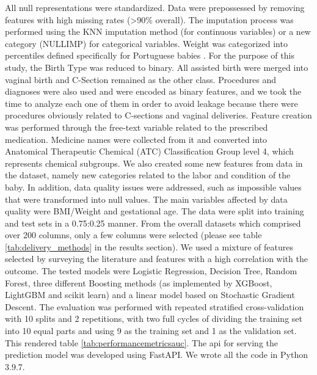 All null representations were standardized. Data were prepossessed by removing features with high missing rates ({\textgreater}90\% overall). The imputation process was performed using the KNN imputation method (for continuous variables) or a new category (NULLIMP) for categorical variables. Weight was categorized into percentiles defined specifically for Portuguese babies \cite{sousa-santosDevelopmentBirthweightStandard2016}. For the purpose of this study, the Birth Type was reduced to binary. All assisted birth were merged into vaginal birth and C-Section remained as the other class. Procedures and diagnoses were also used and were encoded as binary features, and we took the time to analyze each one of them in order to avoid leakage because there were procedures obviously related to C-sections and vaginal deliveries. Feature creation was performed through the free-text variable related to the prescribed medication. Medicine names were collected from it and converted into Anatomical Therapeutic Chemical (ATC) Classification Group level 4, which represents chemical subgroups. We also created some new features from data in the dataset, namely new categories related to the labor and condition of the baby. In addition, data quality issues were addressed, such as impossible values that were transformed into null values. The main variables affected by data quality were BMI/Weight and gestational age. The data were split into training and test sets in a 0.75:0.25 manner. From the overall datasets which comprised over 200 columns, only a few columns were selected (please see table \ref{tab:delivery_methods} in the results section). We used a mixture of features selected by surveying the literature \cite{irwindaMaternalFetalCharacteristics2021,deramonfernandezPredictionModeDelivery2022,parveenAnalysisCesareanSections2021} and features with a high correlation with the outcome. The tested models were Logistic Regression, Decision Tree, Random Forest, three different Boosting methods (as implemented by XGBoost, LightGBM and scikit learn) and a linear model based on Stochastic Gradient Descent. The evaluation was performed with repeated stratified cross-validation with 10 splits and 2 repetitions, with two full cycles of dividing the training set into 10 equal parts and using 9 as the training set and 1 as the validation set. This rendered table \ref{tab:performancemetricsauc}. The \ac{api} for serving the prediction model was developed using FastAPI. We wrote all the code in Python 3.9.7.


